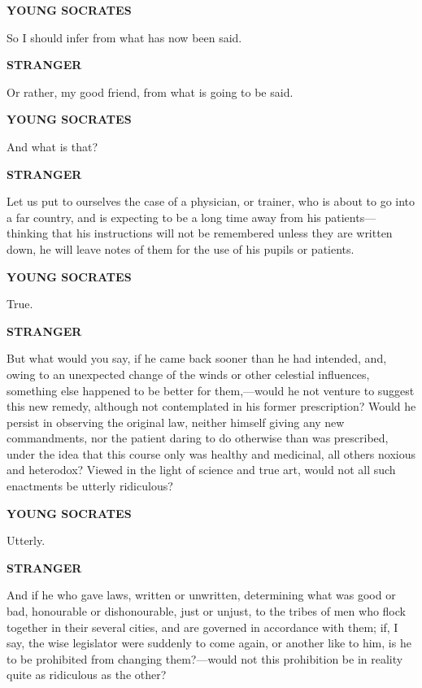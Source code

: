 \documentclass[11pt,letter]{article}
\begin{document}
\par \textbf{YOUNG SOCRATES}
\par   So I should infer from what has now been said.

\par \textbf{STRANGER}
\par   Or rather, my good friend, from what is going to be said.

\par \textbf{YOUNG SOCRATES}
\par   And what is that?

\par \textbf{STRANGER}
\par   Let us put to ourselves the case of a physician, or trainer, who is about to go into a far country, and is expecting to be a long time away from his patients—thinking that his instructions will not be remembered unless they are written down, he will leave notes of them for the use of his pupils or patients.

\par \textbf{YOUNG SOCRATES}
\par   True.

\par \textbf{STRANGER}
\par   But what would you say, if he came back sooner than he had intended, and, owing to an unexpected change of the winds or other celestial influences, something else happened to be better for them,—would he not venture to suggest this new remedy, although not contemplated in his former prescription? Would he persist in observing the original law, neither himself giving any new commandments, nor the patient daring to do otherwise than was prescribed, under the idea that this course only was healthy and medicinal, all others noxious and heterodox? Viewed in the light of science and true art, would not all such enactments be utterly ridiculous?

\par \textbf{YOUNG SOCRATES}
\par   Utterly.

\par \textbf{STRANGER}
\par   And if he who gave laws, written or unwritten, determining what was good or bad, honourable or dishonourable, just or unjust, to the tribes of men who flock together in their several cities, and are governed in accordance with them; if, I say, the wise legislator were suddenly to come again, or another like to him, is he to be prohibited from changing them?—would not this prohibition be in reality quite as ridiculous as the other?
\end{document}
